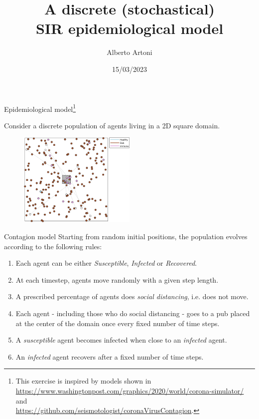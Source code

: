 \documentclass[10pt,aspectratio=169]{beamer}
\begin{document}
    \title{A discrete (stochastical)\protect\\SIR epidemiological model}
    \author{Alberto Artoni}
    \date{15/03/2023}
    
\begin{frame}
    \maketitle
\end{frame}

\begin{frame}{Epidemiological model\footnote{This exercise is inspired by models shown in \\
\url{https://www.washingtonpost.com/graphics/2020/world/corona-simulator/} and \\
\url{https://github.com/seismotologist/coronaVirusContagion}.}}

Consider a discrete population of agents living in a 2D square domain.

\begin{figure}
    \includegraphics[width=0.5\textwidth]{contagion.png}
\end{figure}
\end{frame}

\begin{frame}{Contagion model}
Starting from random initial positions, the population evolves according to the following rules:

\begin{enumerate}
    \item Each agent can be either \textit{Susceptible}, \textit{Infected} or \textit{Recovered}.
    \item At each timestep, agents move randomly with a given step length.
    \item A prescribed percentage of agents does \textit{social distancing}, i.e. does not move.
    \item Each agent - including those who do social distancing - goes to a pub placed at the center of the domain once every fixed number of time steps.
    \item A \textit{susceptible} agent becomes infected when close to an \textit{infected} agent.
    \item An \textit{infected} agent recovers after a fixed number of time steps.
\end{enumerate}
\end{frame}
\end{document}
